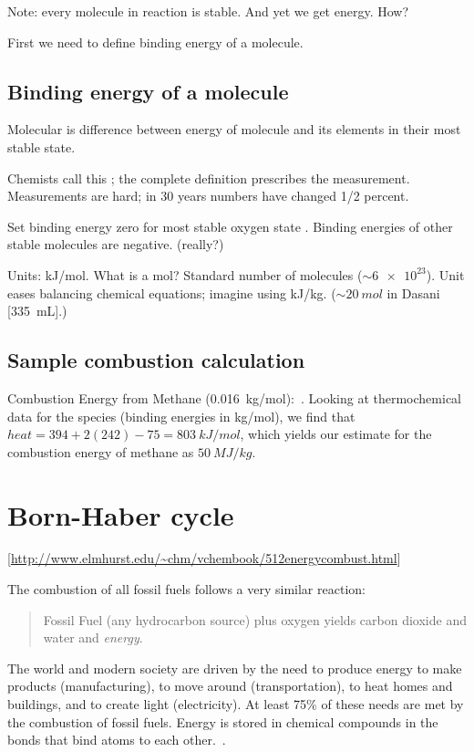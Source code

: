 Note: every molecule in reaction is stable. And yet we get energy. How?

First we need to define binding energy of a molecule.


\subsection*{Binding energy of a molecule}
%
Molecular  is difference between energy of molecule and its elements in their most stable state.

Chemists call this ; the complete definition prescribes the measurement. Measurements are hard; in 30 years numbers have changed 1/2 percent.

Set binding energy zero for most stable oxygen state . Binding energies of other stable molecules are negative. (really?)

Units: \si{kJ/mol}. What is a mol? Standard number of molecules ($\sim\num{6e23}$). Unit eases balancing chemical equations; imagine using \si{kJ/kg}. ($\sim\SI{20}{mol}$ in Dasani [\SI{335}{mL}].)


\subsection*{Sample combustion calculation}
%
Combustion Energy from Methane (\SI{0.016}{kg/mol}):
%
\beq
    \,.
\eeq
%
Looking at thermochemical data for the species (binding energies in \si{kg/mol}), we find that $heat = 394 + 2(242) - 75 = \SI{803}{kJ/mol}$, which yields our estimate for the combustion energy of methane as $\SI{50}{MJ/kg}$.


\section*{Born-Haber cycle}
%
[\url{http://www.elmhurst.edu/~chm/vchembook/512energycombust.html}]

The combustion of all fossil fuels follows a very similar reaction:
%
\begin{quote}
Fossil Fuel (any hydrocarbon source) plus oxygen yields carbon dioxide and water and \emph{energy}.
\end{quote}

The world and modern society are driven by the need to produce energy to make products (manufacturing), to move around (transportation), to heat homes and buildings, and to create light (electricity). At least 75\% of these needs are met by the combustion of fossil fuels. Energy is stored in chemical compounds in the bonds that bind atoms to each other.
%
\beq
    \,.
\eeq
 
